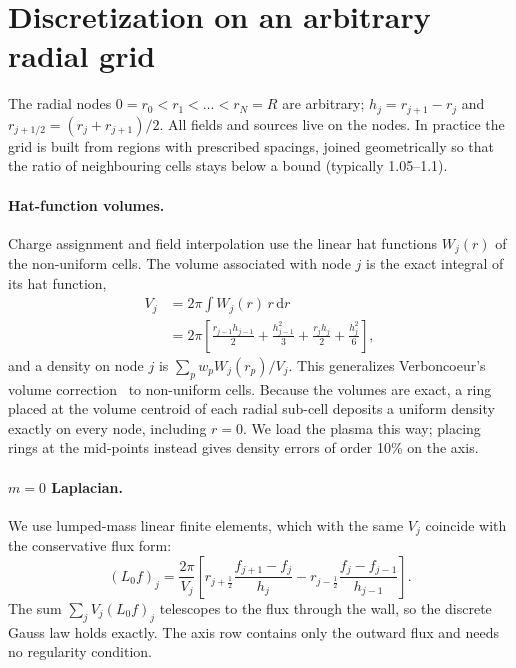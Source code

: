\documentclass[aps,prab,reprint,floatfix,superscriptaddress,amsmath,amssymb]{revtex4-2}
\newcommand{\dd}{\mathrm{d}}
\begin{document}
\section{Discretization on an arbitrary radial grid}\label{sec:disc}

The radial nodes $0 = r_0 < r_1 < \dots < r_N = R$ are arbitrary; $h_j = r_{j+1} - r_j$ and $r_{j+1/2} = (r_j + r_{j+1})/2$. All fields and sources live on the nodes. In practice the grid is built from regions with prescribed spacings, joined geometrically so that the ratio of neighbouring cells stays below a bound (typically 1.05--1.1).

\paragraph{Hat-function volumes.} Charge assignment and field interpolation use the linear hat functions $W_j(r)$ of the non-uniform cells. The volume associated with node $j$ is the exact integral of its hat function,
\begin{align}
V_j &= 2\pi\!\int W_j(r)\,r\,\dd r \nonumber\\
    &= 2\pi\left[\frac{r_{j-1}h_{j-1}}{2} + \frac{h_{j-1}^2}{3} + \frac{r_j h_j}{2} + \frac{h_j^2}{6}\right], \label{eq:vol}
\end{align}
and a density on node $j$ is $\sum_p w_p W_j(r_p)/V_j$. This generalizes Verboncoeur's volume correction~\cite{Verboncoeur2001} to non-uniform cells. Because the volumes are exact, a ring placed at the volume centroid of each radial sub-cell deposits a uniform density exactly on every node, including $r=0$. We load the plasma this way; placing rings at the mid-points instead gives density errors of order 10\% on the axis.

\paragraph{$m=0$ Laplacian.} We use lumped-mass linear finite elements, which with the same $V_j$ coincide with the conservative flux form:
\begin{equation}
(L_0 f)_j = \frac{2\pi}{V_j}\left[r_{j+\frac12}\frac{f_{j+1}-f_j}{h_j} - r_{j-\frac12}\frac{f_j - f_{j-1}}{h_{j-1}}\right]. \label{eq:L0}
\end{equation}
The sum $\sum_j V_j (L_0 f)_j$ telescopes to the flux through the wall, so the discrete Gauss law holds exactly. The axis row contains only the outward flux and needs no regularity condition.
\end{document}
